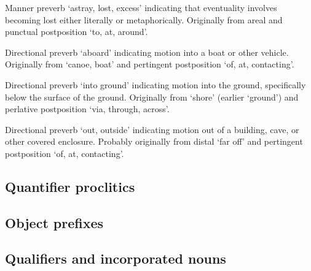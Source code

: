 \begin{morphdesc}
\item[\X{héenx̱=}]

\item[\X{ḵáaḵw=}]
\item[\X{ḵáaḵwt=}]

\item[\X{ḵut=}]
	Manner preverb ‘astray, lost, excess’ indicating that eventuality involves becoming lost
		either literally or metaphorically.
	Originally from areal 
		and punctual postposition  ‘to, at, around’.

\item[\X{ḵwáaḵ=}]
\item[\X{ḵwáaḵx̱=}]
\item[\X{ḵwáaḵt=}]

\item[\X{ux̱=}]

\item[\X{yaax̱=}]
	Directional preverb ‘aboard’ indicating motion into a boat or other vehicle.
	Originally from  ‘canoe, boat’
		and pertingent postposition  ‘of, at, contacting’.

\item[\X{ÿanax̱=}]
	Directional preverb ‘into ground’ indicating motion into the ground, specifically
		below the surface of the ground.
	Originally from  ‘shore’ (earlier ‘ground’)
		and perlative postposition  ‘via, through, across’.

\item[\X{yatx̱=}]

\item[\X{yux̱=}]
	Directional preverb ‘out, outside’ indicating motion out of a building, cave,
		or other covered enclosure.
	Probably originally from distal  ‘far off’
		and pertingent postposition  ‘of, at, contacting’.

\end{morphdesc}

\subsection{Quantifier proclitics}\label{sec:inventory-qfr}

\subsection{Object prefixes}\label{sec:inventory-object}

\subsection{Qualifiers and incorporated nouns}\label{sec:inventory-qualinc}

